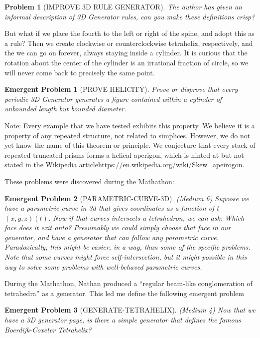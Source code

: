 \documentclass[11pt]{article}
\newtheorem{problem}{Problem}
\newtheorem{eproblem}{Emergent Problem}
\begin{document}
\begin{problem}[IMPROVE 3D RULE GENERATOR]
  The author has given an informal description of 3D Generator rules, can you make these definitions crisp?
\end{problem}

But what if we place the fourth to the left or right of the spine, and adopt this as a rule? Then we create
clockwise or counterclockwise tetrahelix, respectively, and the we can go on forever, always staying inside a cylinder.
It is curious that the rotation about the center of the cylinder is an irrational fraction of circle, so we will
never come back to precisely the same point.

\begin{eproblem}[PROVE HELICITY]
  Prove or disprove that {\em every} periodic 3D Generator generates a figure contained within a cylinder of unbounded length but bounded diameter.
\end{eproblem}
Note: Every example that we have tested exhibits this property. We believe it is a property of any repeated structure, not related to simplices.
However, we do not yet know the name of this theorem or principle. We conjecture that every stack of repeated truncated prisms
forms a helical aperigon, which is hinted at but not stated in the Wikipedia article\url{https://en.wikipedia.org/wiki/Skew_apeirogon}.

These problems were discovered during the Mathathon:
\begin{eproblem}[PARAMETRIC-CURVE-3D] (Medium 6)
  Supoose we have a parametric curve in 3d that gives coordinates as a function of $t$ $(x,y,z)(t)$.
  Now if that curves intersects a tetrahedron, we can ask: Which face does it exit onto? Presumably we could
  simply choose that face in our generator, and have a generator that can follow any parametric curve.
  Paradoxically, this might be easier, in a way, than some of the specific problems. Note that some curves
  might force self-intersection, but it might possible in this way to solve some problems with well-behaved
  parametric curves.
\end{eproblem}
During the Mathathon, Nathan produced a ``regular beam-like conglomeration of tetrahedra'' as a generator. This
led me define the following emergent problem
\begin{eproblem}[GENERATE-TETRAHELIX]
(Medium 4)  Now that we have a 3D generator page, is there a simple generator that defines the famous Boerdijk-Coxeter Tetrahelix?
\end{eproblem}
\end{document}
